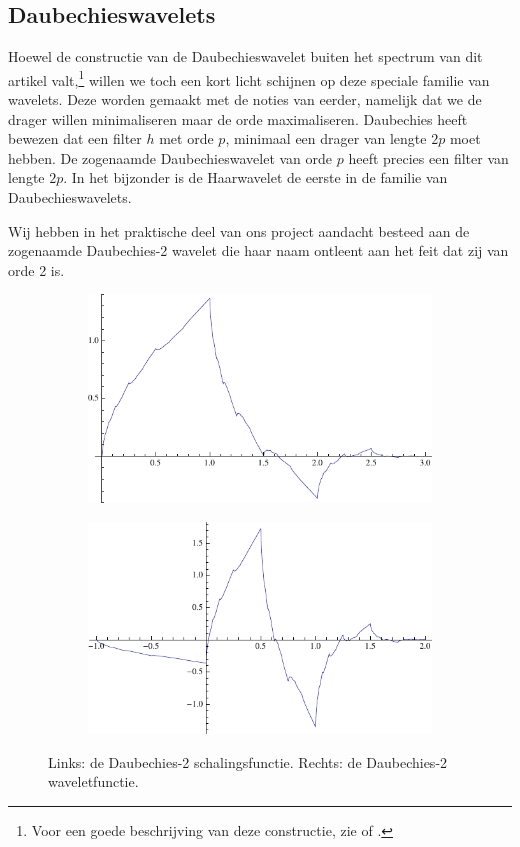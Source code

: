 \documentclass[11pt]{report}
\theoremstyle{plain}
\theoremstyle{remark}
\begin{document}
\subsection{Daubechieswavelets}
Hoewel de constructie van de Daubechieswavelet buiten het spectrum van dit artikel valt,\footnote{Voor een goede beschrijving van deze constructie, zie \cite{mallat} of \cite{daubechies}.} willen we toch een kort licht schijnen op deze speciale familie van wavelets. Deze worden gemaakt met de noties van eerder, namelijk dat we de drager willen minimaliseren maar de orde maximaliseren. Daubechies heeft bewezen\cite{daubechies} dat een filter $h$ met orde $p$, minimaal een drager van lengte $2p$ moet hebben. De zogenaamde Daubechieswavelet van orde $p$ heeft precies een filter van lengte $2p$. In het bijzonder is de Haarwavelet de eerste in de familie van Daubechieswavelets.

Wij hebben in het praktische deel van ons project aandacht besteed aan de zogenaamde Daubechies-2 wavelet die haar naam ontleent aan het feit dat zij van orde 2 is.

\begin{figure}[h]
\centering
\begin{subfigure}{0.48\linewidth}
	\includegraphics[width=\linewidth]{plaatjes/db2_phi.pdf}
\end{subfigure}
\begin{subfigure}{0.48\linewidth}
	\includegraphics[width=\linewidth]{plaatjes/db2_psi.pdf}
\end{subfigure}
\caption{Links: de Daubechies-2 schalingsfunctie. Rechts: de Daubechies-2 waveletfunctie.}
\end{figure}
\end{document}
